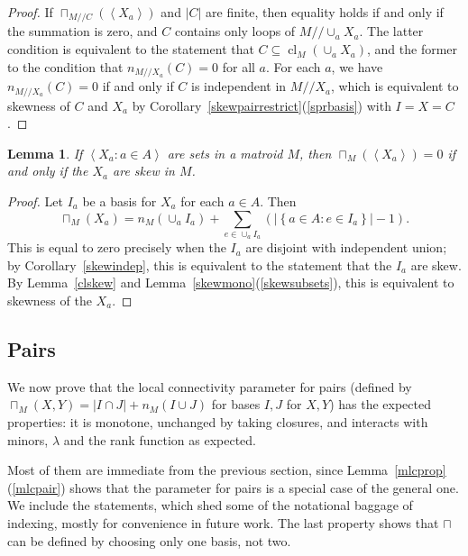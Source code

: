 \documentclass{amsart}
\theoremstyle{plain}
\newtheorem{lemma}[theorem]{Lemma}
\theoremstyle{definition}
\newcommand{\dcon}{/ \!\! /}
\DeclareMathOperator{\cl}{cl}
\newcommand{\abs}[1]{\left| #1 \right|}
\newcommand{\set}[1]{\left\{#1\right\}}
\newcommand{\br}[1]{\left(#1\right)}
\newcommand{\ab}[1]{\left\langle#1\right\rangle}
\renewcommand{\ss}{\subseteq}
\newcommand{\setof}[2]{\set{{#1} : {#2}}}
\begin{document}
\begin{proof}
  If $\sqcap_{M \dcon C}(\ab{X_a})$ and $|C|$ are finite, then 
  equality holds if and only if the summation is zero, and $C$ contains 
  only loops of $M \dcon \cup_a X_a$. 
  The latter condition is equivalent to the statement that $C \ss \cl_M(\cup_a X_a)$, 
  and the former to the condition that $n_{M \dcon X_a}(C) = 0$ for all $a$. 
  For each $a$, we have $n_{M \dcon X_a}(C) = 0$ if and only if $C$ is independent 
  in $M \dcon X_a$,
  which is equivalent to skewness of $C$ and $X_a$ by 
  Corollary~\ref{skewpairrestrict}(\ref{sprbasis}) with $I = X = C$.
\end{proof}

\begin{lemma}\label{lcskewiff}
  If $\ab{X_a : a \in A}$ are sets in a matroid $M$, then $\sqcap_M(\ab{X_a}) = 0$ 
  if and only if the $X_a$ are skew in $M$. 
\end{lemma}
\begin{proof}
  Let $I_a$ be a basis for $X_a$ for each $a \in A$.
  Then 
  \[\sqcap_M(X_a) = n_M(\cup_a I_a) + \sum_{e \in \cup_a I_a}\br{\abs{\setof{a \in A}{e \in I_a}} - 1}.\] 
  This is equal to zero precisely when the $I_a$ are disjoint with independent union;
  by Corollary~\ref{skewindep}, this is equivalent to the statement that the $I_a$ 
  are skew. By Lemma~\ref{clskew} and Lemma~\ref{skewmono}(\ref{skewsubsets}), 
  this is equivalent to skewness of the $X_a$.
\end{proof}


\subsection*{Pairs}

We now prove that the local connectivity parameter for pairs
(defined by $\sqcap_M(X,Y) = |I \cap J| + n_M(I \cup J)$ for bases $I,J$ for $X,Y$)
has the expected properties: it is monotone, unchanged by taking closures, 
and interacts with minors, $\lambda$ and the rank function as expected. 

Most of them are immediate from the previous section, 
since Lemma~\ref{mlcprop}(\ref{mlcpair}) shows that the parameter for 
pairs is a special case of the general one. 
We include the statements, which shed some of the notational baggage of indexing,
mostly for convenience in future work. 
The last property shows that $\sqcap$ can be defined by choosing only one basis, not two. 
\end{document}
